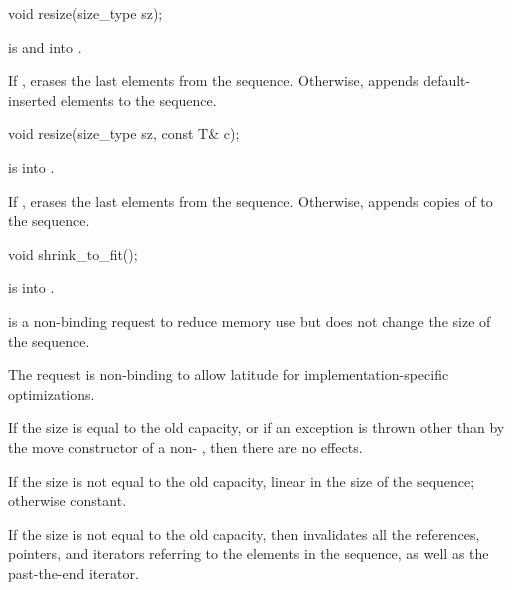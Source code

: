 %
\begin{itemdecl}
void resize(size_type sz);
\end{itemdecl}

\begin{itemdescr}
\pnum
\expects
{} is  and  into .

\pnum
\effects
If , erases the last  elements
from the sequence. Otherwise,
appends  default-inserted elements to the sequence.
\end{itemdescr}

%
\begin{itemdecl}
void resize(size_type sz, const T& c);
\end{itemdecl}

\begin{itemdescr}
\pnum
\expects
{} is  into .

\pnum
\effects
If , erases the last  elements
from the sequence. Otherwise,
appends  copies of  to the sequence.
\end{itemdescr}

%
\begin{itemdecl}
void shrink_to_fit();
\end{itemdecl}

\begin{itemdescr}
\pnum
\expects
{} is  into .

\pnum
\effects
{} is a non-binding request to reduce memory use
but does not change the size of the sequence.
\begin{note}
The request is non-binding to allow latitude for
implementation-specific optimizations.
\end{note}
If the size is equal to the old capacity, or
if an exception is thrown other than by the move constructor
of a non- ,
then there are no effects.

\pnum
\complexity
If the size is not equal to the old capacity,
linear in the size of the sequence;
otherwise constant.

\pnum
\remarks
If the size is not equal to the old capacity,
then invalidates all the references, pointers, and iterators
referring to the elements in the sequence,
as well as the past-the-end iterator.
\end{itemdescr}

